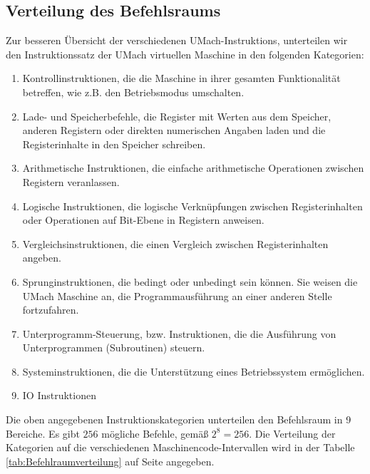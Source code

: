\subsection{Verteilung des Befehlsraums}
Zur besseren Übersicht der verschiedenen UMach-\glspl{Instruktion}, unterteilen
wir den \gls{Instruktionssatz} der UMach virtuellen Maschine in den folgenden
Kategorien:

\begin{enumerate}
  \item Kontrollinstruktionen,  die die Maschine in ihrer gesamten
    Funktionalität betreffen, wie z.B. den Betriebsmodus umschalten.
  \item Lade- und Speicherbefehle, die Register mit Werten aus dem Speicher, 
    anderen Registern oder direkten numerischen Angaben laden und die
    Registerinhalte in den Speicher schreiben.
  \item Arithmetische Instruktionen, die einfache arithmetische Operationen
    zwischen Registern veranlassen.
  \item Logische Instruktionen, die logische Verknüpfungen zwischen
    Registerinhalten oder Operationen auf Bit-Ebene in Registern anweisen.
  \item Vergleichsinstruktionen, die einen Vergleich zwischen
    Registerinhalten angeben.
  \item Sprunginstruktionen, die bedingt oder unbedingt sein können.
    Sie weisen die UMach Maschine an, die Programmausführung an einer anderen
    Stelle fortzufahren.
  \item Unterprogramm-Steuerung, bzw. Instruktionen, die die Ausführung von
    Unterprogrammen (Subroutinen) steuern.
  \item Systeminstruktionen, die die Unterstützung eines
    Betriebssystem ermöglichen.
  \item IO Instruktionen
\end{enumerate}

Die oben angegebenen Instruktionskategorien unterteilen den \gls{Befehlsraum} in
9 Bereiche. Es gibt $256$ mögliche Befehle, gemäß $2^{8} = 256$.
Die Verteilung der Kategorien auf die verschiedenen Maschinencode-Intervallen
wird in der Tabelle \ref{tab:Befehlraumverteilung} auf Seite
\pageref{tab:Befehlraumverteilung} angegeben.

